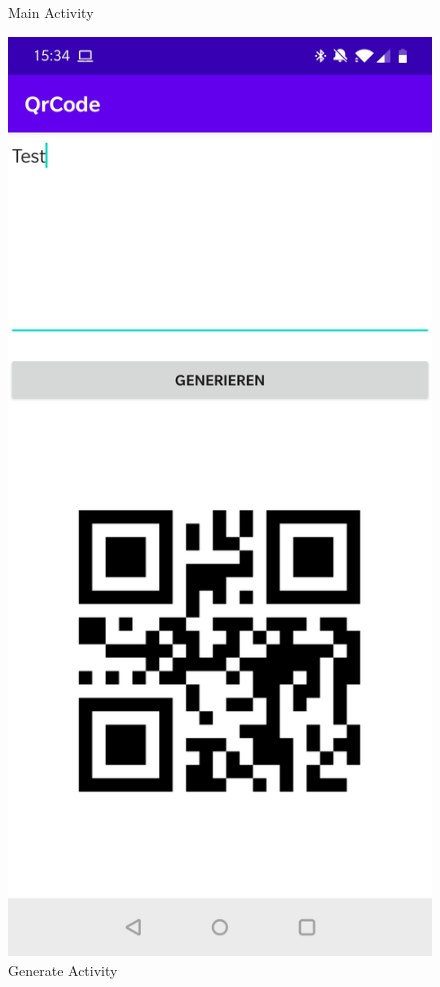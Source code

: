 \documentclass[12pt,					%
							 oneside,			%
							 a4paper,			%
							 halfparskip,		%
							 liststotoc,			%
							 bibtotoc,			%
							 fleqn,				%
							 pointlessnumbers]	%
							 {scrreprt}
\begin{document}
\begin{figure}[ht]
\begin{minipage}[b]{.4\linewidth}
 	\caption{Main Activity}
   \end{minipage}
   \hspace{.1\linewidth}%
   \begin{minipage}[b]{.4\linewidth} %
	\centering
	\includegraphics[scale=0.1]{pictures/Generate} 
	\caption{Generate Activity}
   \end{minipage}
\end{figure}
\end{document}
